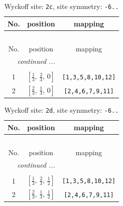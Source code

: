 \documentclass[fleqn,8pt]{jsarticle}
\begin{document}
\begin{longtable}{ccc}
\caption{Wyckoff site: {\tt 2c}, site symmetry: {\tt -6..}}
 \\
 \hline \hline
No. & position & mapping \\ \hline \endfirsthead

\multicolumn{2}{l}{\tablename\ \thetable{}} \\
 \hline \hline
No. & position & mapping \\ \hline \endhead

 \hline \hline
\multicolumn{2}{r}{\footnotesize\it continued ...} \\ \endfoot

 \hline \hline
\multicolumn{2}{r}{} \\ \endlastfoot

1 & $\left[ \frac{1}{3},\, \frac{2}{3},\, 0 \right]$ & {\tt [1,3,5,8,10,12]} \\ \hline
2 & $\left[ \frac{2}{3},\, \frac{1}{3},\, 0 \right]$ & {\tt [2,4,6,7,9,11]} \\
\end{longtable}
\renewcommand{\arraystretch}{1.2}
\begin{longtable}{ccc}
\caption{Wyckoff site: {\tt 2d}, site symmetry: {\tt -6..}}
 \\
 \hline \hline
No. & position & mapping \\ \hline \endfirsthead

\multicolumn{2}{l}{\tablename\ \thetable{}} \\
 \hline \hline
No. & position & mapping \\ \hline \endhead

 \hline \hline
\multicolumn{2}{r}{\footnotesize\it continued ...} \\ \endfoot

 \hline \hline
\multicolumn{2}{r}{} \\ \endlastfoot

1 & $\left[ \frac{1}{3},\, \frac{2}{3},\, \frac{1}{2} \right]$ & {\tt [1,3,5,8,10,12]} \\ \hline
2 & $\left[ \frac{2}{3},\, \frac{1}{3},\, \frac{1}{2} \right]$ & {\tt [2,4,6,7,9,11]} \\
\end{longtable}
\renewcommand{\arraystretch}{1.2}
\end{document}
